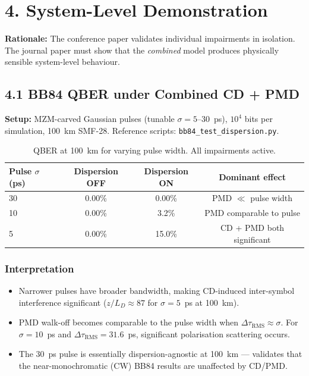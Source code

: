 \documentclass[11pt,a4paper]{article}
\begin{document}
\section{4. System-Level Demonstration}
\label{sec:demonstration}

\noindent\textbf{Rationale:} The conference paper validates individual
impairments in isolation.  The journal paper must show that the \emph{combined}
model produces physically sensible system-level behaviour.

\subsection{4.1 BB84 QBER under Combined CD + PMD}
\label{sec:qber-cd-pmd}

\textbf{Setup:} MZM-carved Gaussian pulses (tunable $\sigma =
5$--30~ps), $10^4$ bits per simulation, 100~km SMF-28.
Reference scripts: \texttt{bb84\_test\_dispersion.py}.

\begin{table}[!ht]
  \caption{QBER at 100~km for varying pulse width.  All impairments active.}
  \label{tab:qber-results}
  \begin{tabular}{l c c c}
    \toprule
    \textbf{Pulse $\sigma$ (ps)} & \textbf{Dispersion OFF} &
    \textbf{Dispersion ON} & \textbf{Dominant effect} \\
    \midrule
    30 & 0.00\% & 0.00\% & PMD $\ll$ pulse width \\
    10 & 0.00\% & 3.2\%  & PMD comparable to pulse \\
     5 & 0.00\% & 15.0\% & CD + PMD both significant \\
    \bottomrule
  \end{tabular}
\end{table}

\subsubsection*{Interpretation}
\begin{itemize}[nosep]
  \item Narrower pulses have broader bandwidth, making CD-induced
    inter-symbol interference significant ($z/L_D \approx 87$ for
    $\sigma = 5$~ps at 100~km).
  \item PMD walk-off becomes comparable to the pulse width when
    $\Delta\tau_{\text{RMS}} \approx \sigma$.  For $\sigma = 10$~ps
    and $\Delta\tau_{\text{RMS}} = 31.6$~ps, significant polarisation
    scattering occurs.
  \item The 30~ps pulse is essentially dispersion-agnostic at 100~km
    --- validates that the near-monochromatic (CW) BB84 results are
    unaffected by CD/PMD.
\end{itemize}
\end{document}
